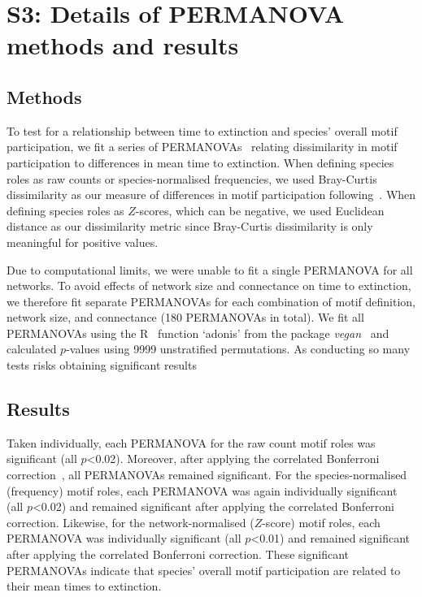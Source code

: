 \documentclass[12pt]{article}
\begin{document}
\clearpage


\section*{S3: Details of PERMANOVA methods and results}

	\subsection*{Methods}


		To test for a relationship between time to extinction and species' overall motif participation, we fit a series of PERMANOVAs~\citep{Anderson2001} relating dissimilarity in motif participation to differences in mean time to extinction.
		When defining species roles as raw counts or species-normalised frequencies, we used Bray-Curtis dissimilarity as our measure of differences in motif participation following~\citet{Baker2015,Cirtwill2015}.
		When defining species roles as $Z$-scores, which can be negative, we used Euclidean distance as our dissimilarity metric since Bray-Curtis dissimilarity is only meaningful for positive values.


		Due to computational limits, we were unable to fit a single PERMANOVA for all networks.
		To avoid effects of network size and connectance on time to extinction, we therefore fit separate PERMANOVAs for each combination of motif definition, network size, and connectance (180 PERMANOVAs in total).
		We fit all PERMANOVAs using the R~\citep{R} function `adonis' from the package \emph{vegan}~\citep{vegan} and calculated $p$-values using 9999 unstratified permutations.
		As conducting so many tests risks obtaining significant results 
	\subsection*{Results}


		Taken individually, each PERMANOVA for the raw count motif roles was significant (all $p$\textless0.02). Moreover, after applying the correlated Bonferroni correction~\citep{Drezner2016}, all PERMANOVAs remained significant.
		For the species-normalised (frequency) motif roles, each PERMANOVA was again individually significant (all $p$\textless0.02) and remained significant after applying the correlated Bonferroni correction.
		Likewise, for the network-normalised ($Z$-score) motif roles, each PERMANOVA was individually significant (all $p$\textless0.01) and remained significant after applying the correlated Bonferroni correction.
		These significant PERMANOVAs indicate that species' overall motif participation are related to their mean times to extinction.
\end{document}
